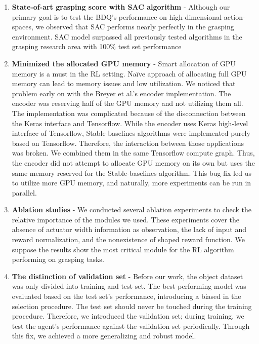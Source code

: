 \begin{enumerate}
    \item \textbf{State-of-art grasping score with SAC algorithm} - Although our primary goal is to test the BDQ's performance on high dimensional action-spaces, we observed that SAC performs nearly perfectly in the grasping environment. SAC model surpassed all previously tested algorithms in the grasping research area with 100\% test set performance
    
    \item \textbf{Minimized the allocated GPU memory
    } - Smart allocation of GPU memory is a must in the RL setting. Naïve approach of allocating full GPU memory can lead to memory issues and low utilization. We noticed that problem early on with the Breyer et al.'s encoder implementation. The encoder was reserving half of the GPU memory and not utilizing them all. The implementation was complicated because of the disconnection between the Keras interface and Tensorflow. While the encoder uses Keras high-level interface of Tensorflow, Stable-baselines algorithms were implemented purely based on Tensorflow. Therefore, the interaction between those applications was broken. We combined them in the same Tensorflow compute graph. Thus, the encoder did not attempt to allocate GPU memory on its own but uses the same memory reserved for the Stable-baselines algorithm. This bug fix led us to utilize more GPU memory, and naturally, more experiments can be run in parallel.
    
    \item \textbf{Ablation studies
    } - We conducted several ablation experiments to check the relative importance of the modules we used. These experiments cover the absence of actuator width information as observation, the lack of input and reward normalization, and the nonexistence of shaped reward function.  We suppose the results show the most critical module for the RL algorithm performing on grasping tasks.
    
    \item \textbf{The distinction of validation set
    } -  Before our work, the object dataset was only divided into training and test set. The best performing model was evaluated based on the test set's performance, introducing a biased in the selection procedure.  The test set should never be touched during the training procedure. Therefore, we introduced the validation set; during training, we test the agent's performance against the validation set periodically. Through this fix, we achieved a more generalizing and robust model.
\end{enumerate}



   

 














